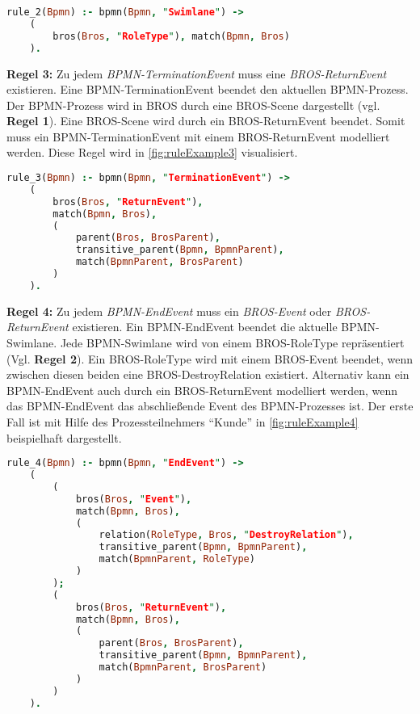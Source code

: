 \begin{lstlisting}[language=Prolog, caption=Formalisierung der Regel 2, label=lst:rule_2]
rule_2(Bpmn) :- bpmn(Bpmn, "Swimlane") ->
    (
        bros(Bros, "RoleType"), match(Bpmn, Bros)
    ).
\end{lstlisting}

\textbf{Regel 3:}
Zu jedem \emph{BPMN-TerminationEvent} muss eine \emph{BROS-ReturnEvent} existieren.
Eine BPMN-TerminationEvent beendet den aktuellen BPMN-Prozess.
Der BPMN-Prozess wird in BROS durch eine BROS-Scene dargestellt (vgl. \textbf{Regel 1}).
Eine BROS-Scene wird durch ein BROS-ReturnEvent beendet.
Somit muss ein BPMN-TerminationEvent mit einem BROS-ReturnEvent modelliert werden.
Diese Regel wird in \cref{fig:ruleExample3} visualisiert.

\begin{lstlisting}[language=Prolog, caption=Formalisierung der Regel 3, label=lst:rule_3]
rule_3(Bpmn) :- bpmn(Bpmn, "TerminationEvent") ->
    (
        bros(Bros, "ReturnEvent"), 
        match(Bpmn, Bros),
        (
            parent(Bros, BrosParent),
            transitive_parent(Bpmn, BpmnParent),
            match(BpmnParent, BrosParent)
        )
    ).
\end{lstlisting}

\textbf{Regel 4:}
Zu jedem \emph{BPMN-EndEvent} muss ein \emph{BROS-Event} oder \emph{BROS-ReturnEvent} existieren.
Ein BPMN-EndEvent beendet die aktuelle BPMN-Swimlane.
Jede BPMN-Swimlane wird von einem BROS-RoleType repräsentiert (Vgl. \textbf{Regel 2}).
Ein BROS-RoleType wird mit einem BROS-Event beendet, wenn zwischen diesen beiden eine BROS-DestroyRelation existiert.
Alternativ kann ein BPMN-EndEvent auch durch ein BROS-ReturnEvent modelliert werden, wenn das BPMN-EndEvent das abschließende Event des BPMN-Prozesses ist.
Der erste Fall ist mit Hilfe des Prozessteilnehmers ``Kunde'' in \cref{fig:ruleExample4} beispielhaft dargestellt.

\begin{lstlisting}[language=Prolog, caption=Formalisierung der Regel 4, label=lst:rule_4]
rule_4(Bpmn) :- bpmn(Bpmn, "EndEvent") ->
    (
        (
            bros(Bros, "Event"),
            match(Bpmn, Bros),
            (
                relation(RoleType, Bros, "DestroyRelation"),
                transitive_parent(Bpmn, BpmnParent),
                match(BpmnParent, RoleType)
            )
        );
        (
            bros(Bros, "ReturnEvent"), 
            match(Bpmn, Bros),
            (
                parent(Bros, BrosParent),
                transitive_parent(Bpmn, BpmnParent),
                match(BpmnParent, BrosParent)
            )
        )
    ).
\end{lstlisting}

